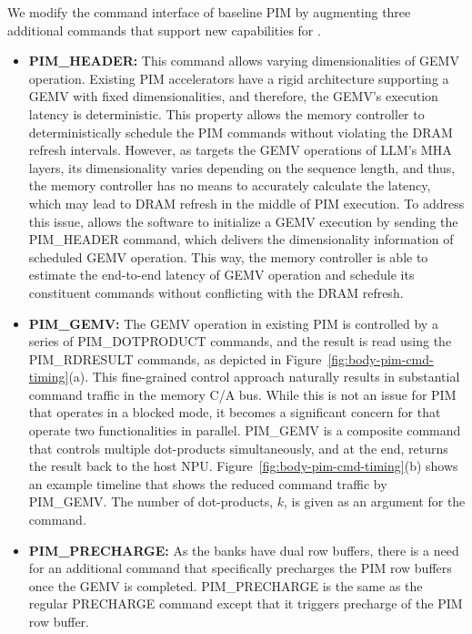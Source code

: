 %
We modify the command interface of baseline PIM by augmenting three additional commands that support new capabilities for \neupims.
%

%

\begin{itemize}
%
\item \textbf{PIM\_HEADER: } 
%
This command allows varying dimensionalities of GEMV operation. 
%
Existing PIM accelerators have a rigid architecture supporting a GEMV with fixed dimensionalities, and therefore, the GEMV's execution latency is deterministic. 
%
This property allows the memory controller to deterministically schedule the PIM commands without violating the DRAM refresh intervals. 
%
However, as \neupims targets the GEMV operations of LLM's MHA layers, its dimensionality varies depending on the sequence length, and thus, the memory controller has no means to accurately calculate the latency, which may lead to DRAM refresh in the middle of PIM execution. 
%
To address this issue, \neupims allows the software to initialize a GEMV execution by sending the PIM\_HEADER command, which delivers the dimensionality information of scheduled GEMV operation. 
%
This way, the memory controller is able to estimate the end-to-end latency of GEMV operation and schedule its constituent commands without conflicting with the DRAM refresh.
%
%

%
\item \textbf{PIM\_GEMV:} 
%
The GEMV operation in existing PIM is controlled by a series of PIM\_DOTPRODUCT commands, and the result is read using the PIM\_RDRESULT commands, as depicted in Figure~\ref{fig:body-pim-cmd-timing}(a).
%
This fine-grained control approach naturally results in substantial command traffic in the memory C/A bus. 
%
While this is not an issue for PIM that operates in a blocked mode, it becomes a significant concern for \neupims that operate two functionalities in parallel.
%
PIM\_GEMV is a composite command that controls multiple dot-products simultaneously, and at the end, returns the result back to the host NPU. 
%
Figure~\ref{fig:body-pim-cmd-timing}(b) shows an example timeline that shows the reduced command traffic by PIM\_GEMV.
%
The number of dot-products, $k$, is given as an argument for the command.
%

\item \textbf{PIM\_PRECHARGE:} 
%
As the \neupims banks have dual row buffers, there is a need for an additional command that specifically precharges the PIM row buffers once the GEMV is completed. 
%
PIM\_PRECHARGE is the same as the regular PRECHARGE command except that it triggers precharge of the PIM row buffer. 
%
\end{itemize}




